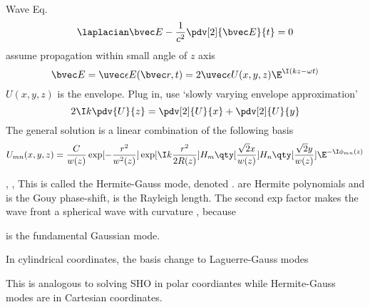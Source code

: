 
Wave Eq.
\begin{equation}
\laplacian \bvec E - \frac{1}{c^2} \pdv[2]{\bvec E}{t} = 0
\end{equation}
assume propagation within small angle of $z$ axis
\begin{equation}
\bvec E = \uvec \epsilon E(\bvec r, t) = 2\uvec \epsilon U(x, y, z) \E^{\I (kz - \omega t)}
\end{equation}
$U(x, y, z)$ is the envelope. Plug in, use ‘slowly varying envelope approximation’
\begin{equation}
2\I k\pdv{U}{z} = \pdv[2]{U}{x} + \pdv[2]{U}{y}
\end{equation}
The general solution is a linear combination of the following basis
\begin{equation}
U_{mn}(x, y, z) = \frac{C}{w(z)} \exp[-\frac{r^2}{w^2(z)}]\exp[\I k\frac{r^2}{2R(z)}] H_m\qty[\frac{\sqrt{2}x}{w(z)}] H_n \qty[\frac{\sqrt{2} y}{w(z)}] \E^{-\I \phi_{mn}(z)}
\end{equation}
 
       
 ,  ,   
This is called the Hermite-Gauss mode, denoted  .  are Hermite polynomials and   is the Gouy phase-shift,   is the Rayleigh length. The second exp factor makes the wave front a spherical wave with curvature  , because
 




  is the fundamental Gaussian mode.

In cylindrical coordinates, the basis change to Laguerre-Gauss modes  
 
  
This is analogous to solving SHO in polar coordiantes while Hermite-Gauss modes are in Cartesian coordinates. 
